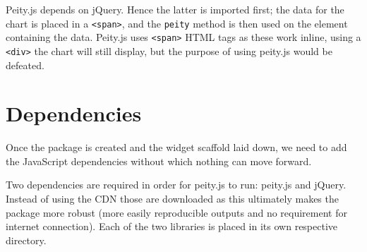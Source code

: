 \documentclass[10pt,]{krantz}
\makeatletter
\newenvironment{Shaded}{\begin{snugshade}}{\end{snugshade}}
\newcommand{\AttributeTok}[1]{\textcolor[rgb]{0.61,0.61,0.61}{#1}}
\newcommand{\CommentTok}[1]{\textcolor[rgb]{0.37,0.37,0.37}{\textit{#1}}}
\newcommand{\DataTypeTok}[1]{\textcolor[rgb]{0.27,0.27,0.27}{#1}}
\newcommand{\KeywordTok}[1]{\textcolor[rgb]{0.27,0.27,0.27}{\textbf{#1}}}
\newcommand{\NormalTok}[1]{#1}
\newcommand{\OperatorTok}[1]{\textcolor[rgb]{0.43,0.43,0.43}{\textbf{#1}}}
\newcommand{\OtherTok}[1]{\textcolor[rgb]{0.37,0.37,0.37}{#1}}
\newcommand{\StringTok}[1]{\textcolor[rgb]{0.5,0.5,0.5}{#1}}
\newenvironment{kframe}{%
\medskip{}
\setlength{\fboxsep}{.8em}
 \def\at@end@of@kframe{}%
 \ifinner\ifhmode%
  \def\at@end@of@kframe{\end{minipage}}%
  \begin{minipage}{\columnwidth}%
 \fi\fi%
 \def\FrameCommand##1{\hskip\@totalleftmargin \hskip-\fboxsep
 \colorbox{shadecolor}{##1}\hskip-\fboxsep
     \hskip-\linewidth \hskip-\@totalleftmargin \hskip\columnwidth}%
 \MakeFramed {\advance\hsize-\width
   \@totalleftmargin\z@ \linewidth\hsize
   \@setminipage}}%
 {\par\unskip\endMakeFramed%
 \at@end@of@kframe}
\renewenvironment{Shaded}{\begin{kframe}}{\end{kframe}}
\makeatother
\begin{document}
\begin{Shaded}
\end{Shaded}

Peity.js depends on jQuery. Hence the latter is imported first; the data for the chart is placed in a \texttt{\textless{}span\textgreater{}}, and the \texttt{peity} method is then used on the element containing the data. Peity.js uses \texttt{\textless{}span\textgreater{}} HTML tags as these work inline, using a \texttt{\textless{}div\textgreater{}} the chart will still display, but the purpose of using peity.js would be defeated.

\hypertarget{widgets-realistic-deps}{%
\section{Dependencies}\label{widgets-realistic-deps}}

Once the package is created and the widget scaffold laid down, we need to add the JavaScript dependencies without which nothing can move forward.

Two dependencies are required in order for peity.js to run: peity.js and jQuery. Instead of using the CDN those are downloaded as this ultimately makes the package more robust (more easily reproducible outputs and no requirement for internet connection). Each of the two libraries is placed in its own respective directory.
\end{document}
